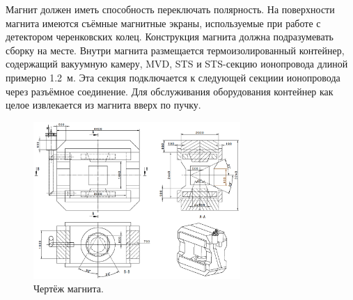 Магнит должен иметь способность переключать полярность.
На поверхности магнита имеются съёмные магнитные экраны, используемые при работе с детектором черенковских колец. %
Конструкция магнита должна подразумевать сборку на месте.
Внутри магнита размещается термоизолированный контейнер, содержащий вакуумную камеру, MVD, STS и STS-секцию ионопровода длиной примерно 1.2~м. Эта секция подключается к следующей секциии ионопровода через разъёмное соединение. Для обслуживания оборудования контейнер как целое извлекается из магнита вверх по пучку.

\begin{figure}[H]
\centering
\includegraphics[width=0.7\textwidth]{pictures/Magnet_drawing.png}
\caption{Чертёж магнита.} %
\label{fig:MagnetDrawing}
\end{figure}


